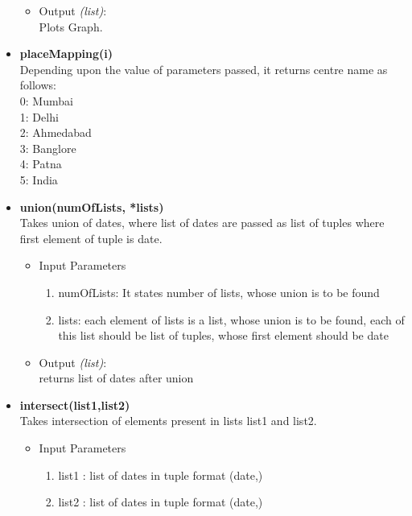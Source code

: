 \begin{itemize}
\begin{itemize}
 \item Output \textit{(list)}: \\
 Plots Graph.
 \end{itemize} 
 
 
 
 \item \textbf{placeMapping(i)} \\
  
 Depending upon the value of parameters passed, it returns centre name as follows:\\
 0: Mumbai\\
 1: Delhi\\
 2: Ahmedabad\\
 3: Banglore\\
 4: Patna\\
 5: India\\
 
 
 
 \item \textbf{union(numOfLists, *lists)} \\
  
 Takes union of dates, where list of dates are passed as list of tuples where first element of tuple is date.
 
 \begin{itemize}
 \item Input Parameters
 
 \begin{enumerate}
  	\item numOfLists: It states number of lists, whose union is to be found
	\item lists: each element of lists is a list, whose union is to be found, each of this list should be list of tuples, whose first element should be date
 \end{enumerate}

 \item Output \textit{(list)}: \\
 returns list of dates after union
 \end{itemize}
 

 \item \textbf{intersect(list1,list2)} \\
  
 Takes intersection of elements present in lists list1 and list2.
 
 \begin{itemize}
 \item Input Parameters
 
 \begin{enumerate}
  	\item list1 : list of dates in tuple format (date,)
	\item list2 : list of dates in tuple format (date,)
 \end{enumerate}


\end{itemize}
\end{itemize}
